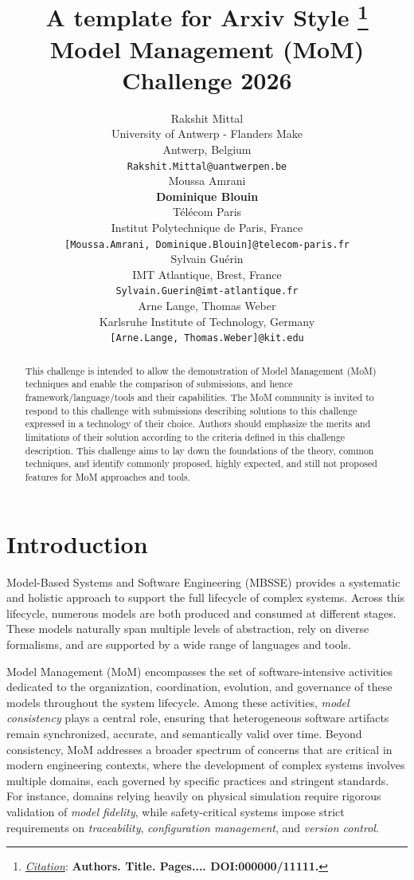\documentclass{article}
\title{A template for Arxiv Style
\thanks{\textit{\underline{Citation}}: 
\textbf{Authors. Title. Pages.... DOI:000000/11111.}} 
}
\author{
  Rakshit Mittal\\
  University of Antwerp - Flanders Make\\ Antwerp, Belgium\\
  \texttt{Rakshit.Mittal@uantwerpen.be} \\
   \And
  Moussa Amrani\\ \textbf{Dominique Blouin}\\
  Télécom Paris\\Institut Polytechnique de Paris, France\\
  \texttt{[Moussa.Amrani, Dominique.Blouin]@telecom-paris.fr} \\
   \AND
  Sylvain Guérin\\
  IMT Atlantique, Brest, France\\
  \texttt{Sylvain.Guerin@imt-atlantique.fr} \\
   \And
   Arne Lange, Thomas Weber\\
   Karlsruhe Institute of Technology, Germany\\
   \texttt{[Arne.Lange, Thomas.Weber]@kit.edu}
}
\begin{document}
\title{Model Management (MoM) Challenge 2026}

\maketitle


\vspace{-1cm}
\begin{abstract}
This challenge is intended to allow the demonstration of Model Management (MoM) techniques and enable the comparison of submissions, and hence framework/language/tools and their capabilities. The MoM community is invited to respond to this challenge with submissions describing solutions to this challenge expressed in a technology of their choice. Authors should emphasize the merits and limitations of their solution according to the criteria defined in this challenge description. This challenge aims to lay down the foundations of the theory, common techniques, and identify commonly proposed, highly expected, and still not proposed features for MoM approaches and tools.
\end{abstract}

\section{Introduction}
\label{sec:Introduction}

Model-Based Systems and Software Engineering (MBSSE) provides a systematic and
holistic approach to support the full lifecycle of complex systems. Across this
lifecycle, numerous models are both produced and consumed at different stages.
These models naturally span multiple levels of abstraction, rely on diverse
formalisms, and are supported by a wide range of languages and tools.

Model Management (MoM) encompasses the set of software-intensive activities
dedicated to the organization, coordination, evolution, and governance of these
models throughout the system lifecycle. Among these activities, \emph{model
consistency} plays a central role, ensuring that heterogeneous software artifacts
remain synchronized, accurate, and semantically valid over time. Beyond
consistency, MoM addresses a broader spectrum of concerns that are critical in
modern engineering contexts, where the development of complex systems involves
multiple domains, each governed by specific practices and stringent standards.
For instance, domains relying heavily on physical simulation require rigorous
validation of \emph{model fidelity}, while safety-critical systems impose strict
requirements on \emph{traceability}, \emph{configuration management}, and \emph{version control}.
\end{document}
